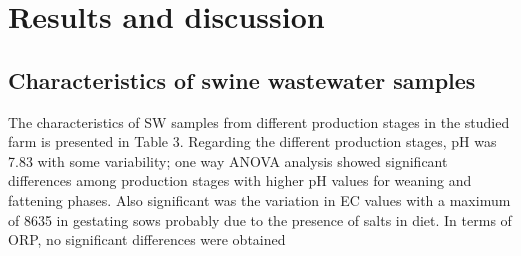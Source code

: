 \section{Results and discussion}
\subsection{Characteristics of swine wastewater samples}
The characteristics of SW samples from different production stages in the studied farm is presented in Table 3. Regarding the different production stages, pH was 7.83 with some variability; one way ANOVA analysis showed significant differences among production stages with higher pH values for weaning and fattening phases. Also significant was the variation in EC values with a maximum of 8635  in gestating sows probably due to the presence of salts in diet. In terms of ORP, no significant differences were obtained 